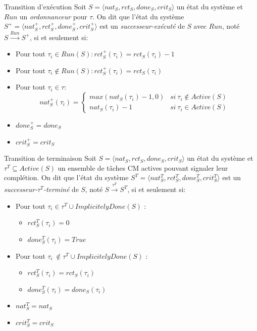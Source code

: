 \documentclass{bredelebeamer}
\begin{document}
\begin{frame}{Transition d'exécution}
Soit $S = \langle nat_S, rct_S, done_S, crit_S \rangle$ un état du système et $Run$ un \textit{ordonnanceur} pour $\tau$. On dit que l'état du système $S^+ = \langle nat_S^+, rct_S^+, done_S^+, crit_S^+ \rangle$ est un \textit{successeur-exécuté} de $S$ avec $Run$, noté $S\xrightarrow{Run}S^+$, si et seulement si:
\begin{itemize}
\item Pour tout $\tau_i \in Run(S) : rct_S^+(\tau_i) = rct_S(\tau_i)-1$
\item Pour tout $\tau_i \not \in Run(S) : rct_S^+(\tau_i) = rct_S(\tau_i)$
\item Pour tout $\tau_i \in \tau :$
$$ nat_S^+(\tau_i) = \left\{
    \begin{array}{ll}
        max(nat_S(\tau_i)-1, 0) & si\ \tau_i \notin Active(S) \\
        nat_S(\tau_i)-1 & si\ \tau_i \in Active(S) 
    \end{array}
\right.
$$
\item $done_{S}^{+} = done_{S}$
\item $crit_{S}^{+} = crit_{S}$\\
\end{itemize}
\end{frame}


\begin{frame}{Transition de terminaison}
Soit $S = \langle nat_S, rct_S, done_S, crit_S\rangle$ un état du système et $\tau^T \subseteq Active(S)$ un ensemble de tâches CM actives pouvant signaler leur complétion. On dit que l'état du système $S^T = \langle nat_S^T, rct_S^T, done_S^T, crit_S^T \rangle$ est un \textit{successeur-$\tau^T$-terminé} de $S$, noté $S\xrightarrow{\tau^T}S^T$, si et seulement si:

\begin{itemize}
\item Pour tout $\tau_i \in \tau^T \cup ImplicitelyDone(S)$ :\begin{itemize}
\item $rct_{S}^T(\tau_i) = 0$
\item $done_{S}^T(\tau_i) = True$
\end{itemize}
\item Pour tout $\tau_i\ \notin \tau^T \cup ImplicitelyDone(S)$ :\begin{itemize}
\item $rct_{S}^T(\tau_i) = rct_{S}(\tau_i)$
\item $done_{S}^T(\tau_i) = done_{S}(\tau_i)$
\end{itemize}
\item $nat_{S}^T = nat_{S}$
\item $crit_{S}^T = crit_{S}$\\
\end{itemize}
\end{frame}
\end{document}
